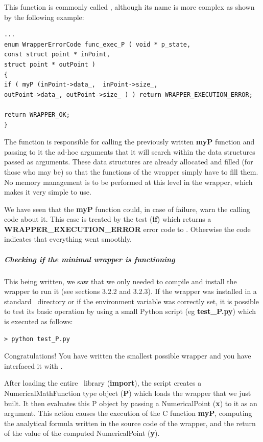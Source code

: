 This function is commonly called , although its name is more complex as shown by the following example:

\lstset{language=C, basicstyle=\normalsize}
\begin{lstlisting}[frame=TBRL]
...
enum WrapperErrorCode func_exec_P ( void * p_state,
const struct point * inPoint,
struct point * outPoint )
{
if ( myP (inPoint->data_,  inPoint->size_,
outPoint->data_, outPoint->size_ ) ) return WRAPPER_EXECUTION_ERROR;

return WRAPPER_OK;
}
\end{lstlisting}

The  function is responsible for calling the previously written {\bf myP} function and passing to it the ad-hoc arguments that it will search within the data structures passed as arguments. These data structures are already allocated and filled (for those who may be) so that the functions of the wrapper simply have to fill them. No memory management is to be performed at this level in the wrapper, which makes it very simple to use.

We have seen that the {\bf myP} function could, in case of failure, warn the calling code about it. This case is treated by the test ({\bf if}) which returns a {\bf WRAPPER\_EXECUTION\_ERROR} error code to \OT. Otherwise the  code indicates that everything went smoothly.

\subparagraph{Checking if the minimal wrapper is functioning}

This being written, we saw that we only needed to compile and install the wrapper to run it (see sections 3.2.2 and 3.2.3). If the wrapper was installed in a standard \OT\ directory or if the  environment variable was correctly set, it is possible to test its basic operation by using a small Python script (eg {\bf test\_P.py}) which is executed as follows:

\lstset{language=Bash, basicstyle=\normalsize}
\begin{lstlisting}[frame=TBRL]
> python test_P.py
\end{lstlisting}

Congratulations! You have written the smallest possible wrapper and you have interfaced it with \OT.

After loading the entire \OT\ library ({\bf import}), the script creates a NumericalMathFunction type object ({\bf P}) which loads the wrapper that we just built. It then evaluates this P object by passing a NumericalPoint ({\bf x}) to it as an argument. This action causes the execution of the C function {\bf myP}, computing the analytical formula written in the source code of the wrapper, and the return of the value of the computed NumericalPoint ({\bf y}).


